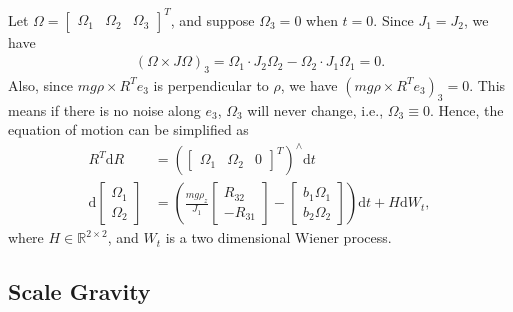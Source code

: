 \documentclass[10pt]{article}
\newcommand{\diff}[1]{\mathrm{d}#1}
\newcommand{\real}{\ensuremath{\mathbb{R}}}
\begin{document}
Let $\Omega = \begin{bmatrix} \Omega_1 & \Omega_2 & \Omega_3 \end{bmatrix}^T$, and suppose $\Omega_3 = 0$ when $t=0$.
Since $J_1 = J_2$, we have
\begin{align}
	(\Omega\times J\Omega)_3 = \Omega_1\cdot J_2\Omega_2 - \Omega_2\cdot J_1\Omega_1= 0.
\end{align}
Also, since $mg\rho\times R^Te_3$ is perpendicular to $\rho$, we have $(mg\rho\times R^Te_3)_3 = 0$.
This means if there is no noise along $e_3$, $\Omega_3$ will never change, i.e., $\Omega_3 \equiv 0$.
Hence, the equation of motion can be simplified as
\begin{align}
	R^T\diff{R} &= \left( \begin{bmatrix} \Omega_1 & \Omega_2 & 0 \end{bmatrix}^T \right)^\wedge \diff{t} \\
	\diff{\begin{bmatrix} \Omega_1 \\ \Omega_2 \end{bmatrix}} &= \left( \frac{mg\rho_z}{J_1} \begin{bmatrix} R_{32} \\ -R_{31} \end{bmatrix} - \begin{bmatrix} b_1\Omega_1 \\ b_2\Omega_2 \end{bmatrix} \right) \diff{t} + H\diff{W}_t,
\end{align}
where $H\in\real^{2\times 2}$, and $W_t$ is a two dimensional Wiener process.

\subsection{Scale Gravity}
\end{document}
